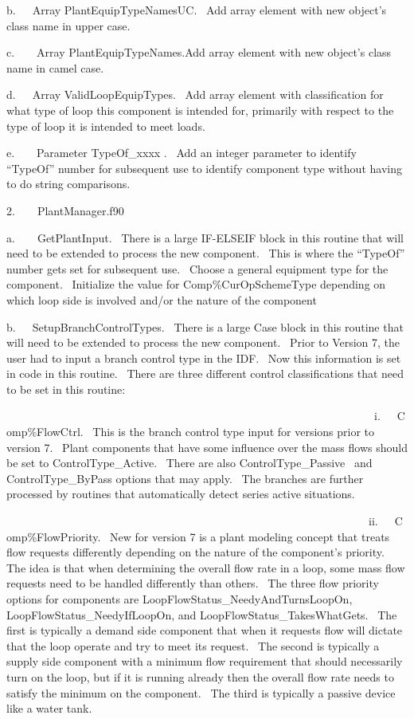 b.~~~Array PlantEquipTypeNamesUC.~ Add array element with new object's class name in upper case.

c.~~~~Array PlantEquipTypeNames.Add array element with new object's class name in camel case.

d.~~~Array ValidLoopEquipTypes.~ Add array element with classification for what type of loop this component is intended for, primarily with respect to the type of loop it is intended to meet loads.

e.~~~~Parameter TypeOf\_xxxx .~ Add an integer parameter to identify ``TypeOf'' number for subsequent use to identify component type without having to do string comparisons.

2.~~~~PlantManager.f90

a.~~~~GetPlantInput.~ There is a large IF-ELSEIF block in this routine that will need to be extended to process the new component.~ This is where the ``TypeOf'' number gets set for subsequent use.~ Choose a general equipment type for the component.~ Initialize the value for Comp\%CurOpSchemeType depending on which loop side is involved and/or the nature of the component

b.~~~SetupBranchControlTypes.~ There is a large Case block in this routine that will need to be extended to process the new component.~ Prior to Version 7, the user had to input a branch control type in the IDF.~ Now this information is set in code in this routine.~ There are three different control classifications that need to be set in this routine:

~~~~~~~~~~~~~~~~~~~~~~~~~~~~~~~~~~~~~~~~~~~~~~~~~~~~~~~~~~~~~~~~~~i.~~~Comp\%FlowCtrl.~ This is the branch control type input for versions prior to version 7.~ Plant components that have some influence over the mass flows should be set to ControlType\_Active.~ There are also ControlType\_Passive~ and ControlType\_ByPass options that may apply.~ The branches are further processed by routines that automatically detect series active situations.

~~~~~~~~~~~~~~~~~~~~~~~~~~~~~~~~~~~~~~~~~~~~~~~~~~~~~~~~~~~~~~~~~ii.~~~Comp\%FlowPriority.~ New for version 7 is a plant modeling concept that treats flow requests differently depending on the nature of the component's priority.~ The idea is that when determining the overall flow rate in a loop, some mass flow requests need to be handled differently than others.~ The three flow priority options for components are LoopFlowStatus\_NeedyAndTurnsLoopOn, LoopFlowStatus\_NeedyIfLoopOn, and LoopFlowStatus\_TakesWhatGets.~ The first is typically a demand side component that when it requests flow will dictate that the loop operate and try to meet its request.~ The second is typically a supply side component with a minimum flow requirement that should necessarily turn on the loop, but if it is running already then the overall flow rate needs to satisfy the minimum on the component.~ The third is typically a passive device like a water tank.


